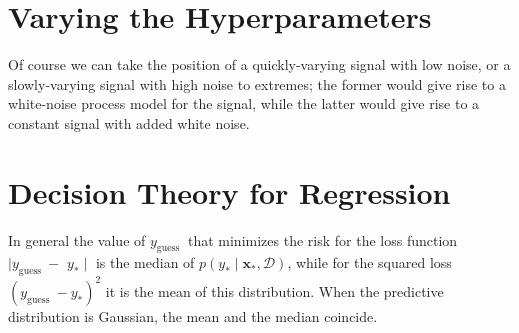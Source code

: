 \documentclass{article}
\begin{document}
\section{Varying the Hyperparameters}
Of course we can take the position of a quickly-varying signal with low noise, or a slowly-varying signal with high noise to extremes; the former would give rise to a white-noise process model for the signal, while the latter would give rise to a constant signal with added white noise.

\section{Decision Theory for Regression}
In general the value of $y_{\text {guess }}$ that minimizes the risk for the loss function $\mid y_{\text {guess }}-$ $y_{*} \mid$ is the median of $p\left(y_{*} \mid \mathbf{x}_{*}, \mathcal{D}\right)$, while for the squared loss $\left(y_{\text {guess }}-y_{*}\right)^{2}$ it is the mean of this distribution. When the predictive distribution is Gaussian, the mean and the median coincide.




\nocite{*}
\appendix
\end{document}
